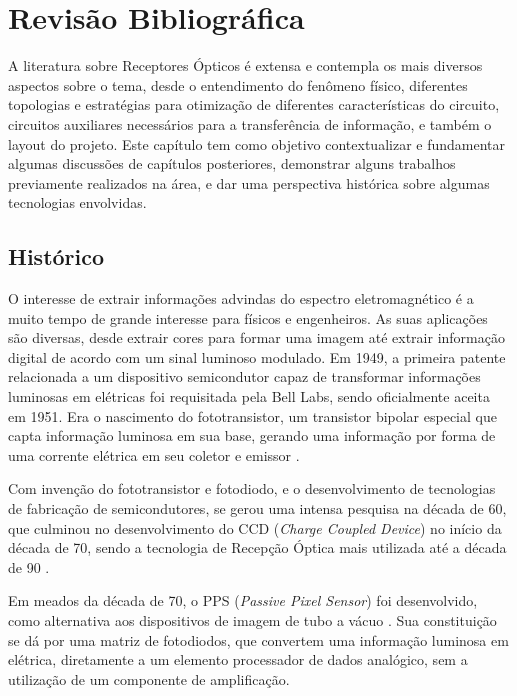 \chapter[Revisão Bibliográfica]{Revisão Bibliográfica}

A literatura sobre Receptores Ópticos \'e extensa e contempla os mais diversos aspectos sobre o tema, desde o entendimento do fenômeno físico, diferentes topologias e estrat\'egias para otimização de diferentes características do circuito, circuitos auxiliares necessários para a transferência de informação, e tamb\'em o layout do projeto. Este capítulo tem como objetivo contextualizar e fundamentar algumas discussões de capítulos posteriores, demonstrar alguns trabalhos previamente realizados na área, e dar uma perspectiva histórica sobre algumas tecnologias envolvidas.
\section{Histórico}
O interesse de extrair informações advindas do espectro eletromagn\'etico \'e a muito tempo de grande interesse para físicos e engenheiros. As suas aplicações são diversas, desde extrair cores para formar uma imagem at\'e extrair informação digital de acordo com um sinal luminoso modulado.
Em 1949, a primeira patente relacionada a um dispositivo semicondutor capaz de transformar informações luminosas em el\'etricas foi requisitada pela Bell Labs, sendo oficialmente aceita em 1951. Era o nascimento do fototransistor, um transistor bipolar especial que capta informação luminosa em sua base, gerando uma informação por forma de uma corrente el\'etrica em seu coletor e emissor \cite{Shive}.

Com invenção do fototransistor e fotodiodo, e o desenvolvimento de tecnologias de fabricação de semicondutores, se gerou uma intensa pesquisa na d\'ecada de 60, que culminou no desenvolvimento do CCD (\textit{Charge Coupled Device}) no início da d\'ecada de 70, sendo a tecnologia de Recepção Óptica mais utilizada at\'e a d\'ecada de 90 \cite{EstevaoCoelho, Andre}.

Em meados da d\'ecada de 70, o PPS (\textit{Passive Pixel Sensor}) foi desenvolvido, como alternativa aos dispositivos de imagem de tubo a vácuo \cite{Savvas}. Sua constituição se dá por uma matriz de fotodiodos, que convertem uma informação luminosa em el\'etrica, diretamente a um elemento processador de dados analógico, sem a utilização de um componente de amplificação.

